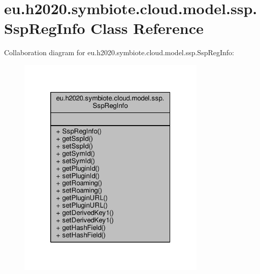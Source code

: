 \hypertarget{classeu_1_1h2020_1_1symbiote_1_1cloud_1_1model_1_1ssp_1_1SspRegInfo}{}\section{eu.\+h2020.\+symbiote.\+cloud.\+model.\+ssp.\+Ssp\+Reg\+Info Class Reference}
\label{classeu_1_1h2020_1_1symbiote_1_1cloud_1_1model_1_1ssp_1_1SspRegInfo}


Collaboration diagram for eu.\+h2020.\+symbiote.\+cloud.\+model.\+ssp.\+Ssp\+Reg\+Info\+:
\nopagebreak
\begin{figure}[H]
\begin{center}
\leavevmode
\includegraphics[width=254pt]{classeu_1_1h2020_1_1symbiote_1_1cloud_1_1model_1_1ssp_1_1SspRegInfo__coll__graph}
\end{center}
\end{figure}

